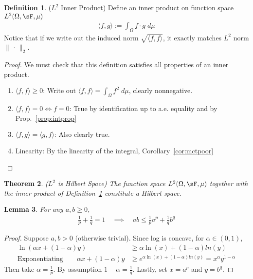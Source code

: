 \documentclass[12pt]{article}
\theoremstyle{plain}
\newtheorem{thm}{Theorem}[section]
\newtheorem{lem}[thm]{Lemma}
\theoremstyle{definition}
\newtheorem{defn}[thm]{Definition}
\theoremstyle{remark}
\begin{document}
\begin{defn}($L^2$ Inner Product)
\label{defn:L2}
Define an inner product on function space $L^2(\Omega,\sF,\mu)$
\begin{align*}
  \langle f,g \rangle
  := \int_\Omega f\cdot g \; d\mu
\end{align*}
Notice that if we write out the induced norm
$\sqrt{\langle f,f\rangle}$, it exactly matches $L^2$ norm
$\lVert \,\cdot\,\rVert_2$.
\end{defn}
\begin{proof}
We must check that this definition satisfies all properties of an inner
product.
\begin{enumerate}[label=(\roman*)]
  \item $\langle f,f \rangle\geq 0$:
    Write out $\langle f,f\rangle = \int_\Omega f^2\;d\mu$,
    clearly nonnegative.
  \item $\langle f,f \rangle= 0 \iff f=0$:
    True by identification up to a.e.  equality and by
    Prop.~\ref{prop:intprop}
  \item $\langle f,g \rangle =\langle g,f \rangle$:
    Also clearly true.
  \item Linearity: By the linearity of the integral,
    Corollary~\ref{cor:mctpoor}
\end{enumerate}
\end{proof}

\begin{thm}\emph{($L^2$ is Hilbert Space)}
\label{thm:L2}
The function space $L^2(\Omega,\sF,\mu)$ together with the
inner product of Definition~\ref{defn:L2} constitute a Hilbert space.
\end{thm}

\begin{lem}
\label{lem:holder}
For any $a,b\geq 0$,
\begin{align*}
  \frac{1}{p}+\frac{1}{q}=1
  \quad\implies\quad
  ab
  \leq
  \frac{1}{p} a^p + \frac{1}{q} b^q
\end{align*}
\end{lem}
\begin{proof}
Suppose $a,b>0$ (otherwise trivial).
Since log is concave, for $\alpha\in(0,1)$,
\begin{align*}
  \ln(\alpha x + (1-\alpha)y)
  &\geq
  \alpha \ln(x) + (1-\alpha)ln(y) \\
  \text{Exponentiating} \qquad
  \alpha x + (1-\alpha)y
  &\geq
  e^{\alpha \ln(x) + (1-\alpha)ln(y)}
  = x^\alpha y^{1-\alpha}
\end{align*}
Then take $\alpha =\frac{1}{p}$. By assumption $1-\alpha=\frac{1}{q}$.
Lastly, set $x=a^p$ and $y=b^q$.
\end{proof}
\end{document}
